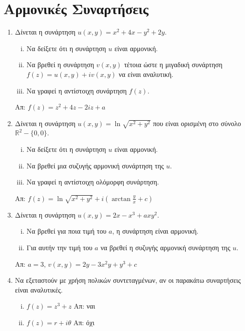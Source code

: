 \documentclass[a4paper,table]{report}
\begin{document}
\begin{center}
  \minibox{\large\bfseries \textcolor{Col1}{Ασκήσεις στις Αρμονικές Συναρτήσεις}}
\end{center}

\vspace{\baselineskip} 


\section*{Αρμονικές Συναρτήσεις}

\begin{enumerate}

  \item Δίνεται η συνάρτηση $ u(x,y) = x^{2} +4x-y^{2}+2y $. 
    \begin{enumerate}[i)]
      \item Να δείξετε ότι η συνάρτηση $ u $ είναι αρμονική.
      \item Να βρεθεί η συνάρτηση $ v(x,y) $ τέτοια ώστε η μιγαδική συνάρτηση 
        $ f(z) = u(x,y) + iv(x,y) $ να είναι αναλυτική. 
      \item Να γραφεί η αντίστοιχη συνάρτηση $ f(z) $.
    \end{enumerate}

    \hfill Απ: $ f(z) = z^{2}+4z-2iz+a $ 

  \item Δίνεται η συνάρτηση $ u(x,y) = \ln{\sqrt{x^{2}+y^{2}}} $ που είναι ορισμένη 
    στο σύνολο $ \mathbb{R}^{2}- \{ 0,0 \} $. 
    \begin{enumerate}[i)]
      \item Να δείξετε ότι η συνάρτηση $ u $ είναι αρμονική.
      \item Να βρεθεί μια συζυγής αρμονική συνάρτηση της $u$.
      \item Να γραφεί η αντίστοιχη ολόμορφη συνάρτηση.
    \end{enumerate}

    \hfill Απ: $ f(z) = \ln{\sqrt{x^{2}+y^{2}}} + i(\arctan{\frac{y}{x}} + c)  $ 

  \item Δίνεται η συνάρτηση $ u(x,y) = 2x-x^{3}+axy^{2} $. 
    \begin{enumerate}[i)]
      \item Να βρεθεί για ποια τιμή του $a$, η συνάρτηση είναι αρμονική. 
      \item Για αυτήν την τιμή του $a$ να βρεθεί η συζυγής αρμονική συνάρτηση της $u$.
    \end{enumerate} 

    \hfill Απ: $ a=3 $, $ v(x,y) = 2y-3x^{2}y+y^{3}+c $ 

  \item Να εξεταστούν με χρήση πολικών συντεταγμένων, αν οι παρακάτω συναρτήσεις είναι
    αναλυτικές. 
    \begin{enumerate}[i)]
      \item $ f(z)=z^{3}+z $ \hfill Απ: ναι 
      \item $ f(z) = r + i \theta $ \hfill Απ: όχι 
    \end{enumerate} 
\end{enumerate}
\end{document}
